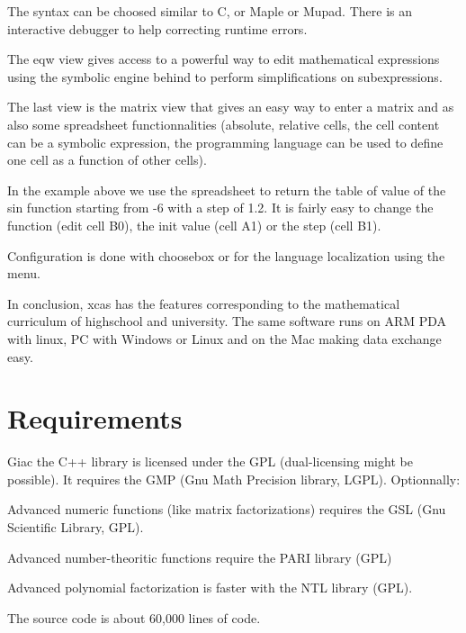 \documentclass{article}
\begin{document}

The syntax can be choosed similar to C, or Maple or Mupad. There is an
interactive debugger to help correcting runtime errors.

The eqw view gives access to a powerful way to edit mathematical expressions
using the symbolic engine behind to perform simplifications on subexpressions.


The last view is the matrix view that gives an easy way to enter a matrix and
as also some spreadsheet functionnalities (absolute, relative cells, the cell
content can be a symbolic expression, the programming language can be used to
define one cell as a function of other cells).


In the example above we use the spreadsheet to return the table of value of
the sin function starting from -6 with a step of 1.2. It is fairly easy to
change the function (edit cell B0), the init value (cell A1) or the step (cell
B1).

Configuration is done with choosebox or for the language localization using
the menu.

In conclusion, xcas has the features corresponding to the mathematical
curriculum of highschool and university. The same software runs on ARM PDA
with linux, PC with Windows or Linux and on the Mac making data exchange easy.

\section{Requirements}

Giac the C++ library is licensed under the GPL (dual-licensing might be
possible). It requires the GMP (Gnu Math Precision library, LGPL).
Optionnally:
\begin{enumerateroman}
  \item Advanced numeric functions (like matrix factorizations) requires the
  GSL (Gnu Scientific Library, GPL).
  
  \item Advanced number-theoritic functions require the PARI library (GPL)
  
  \item Advanced polynomial factorization is faster with the NTL library
  (GPL).
\end{enumerateroman}
The source code is about 60,000 lines of code.
\end{document}
